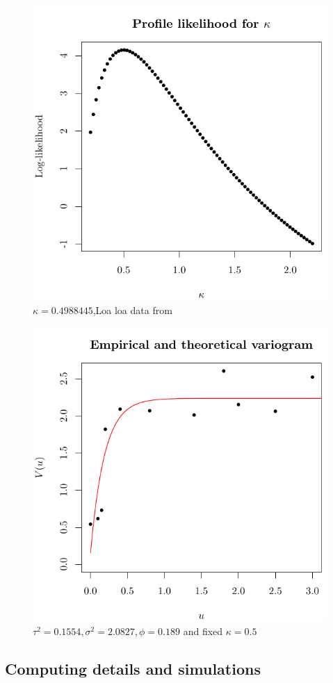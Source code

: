 \documentclass[11pt,compress,UTF8]{beamer}
\begin{document}
\begin{frame}
\begin{figure}
\centering
\includegraphics[width=.65\textwidth]{kappa}
\caption{$\kappa=0.4988445$,Loa loa data from \cite{R-PrevMap}}
\end{figure}
\end{frame}


\begin{frame}
\begin{figure}
\centering
\includegraphics[width=.65\textwidth]{variogram}
\caption{$\tau^2=0.1554,\sigma^2=2.0827,\phi=0.189$ and fixed $\kappa=0.5$}
\end{figure}
\end{frame}
 

\subsection{Computing details and simulations}
\end{document}

